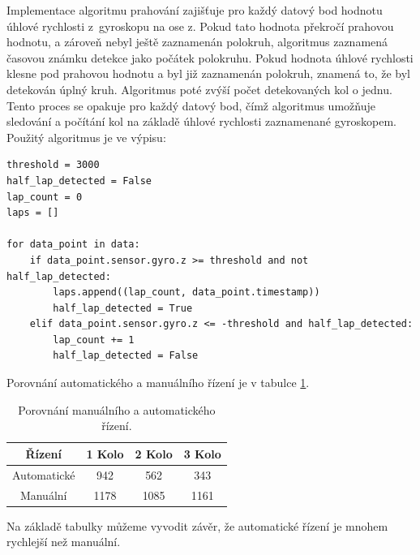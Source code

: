 Implementace algoritmu prahování zajišťuje pro každý datový bod hodnotu úhlové
rychlosti z~gyroskopu na ose z. Pokud tato hodnota překročí prahovou hodnotu, a
zároveň nebyl ještě zaznamenán polokruh, algoritmus zaznamená časovou známku detekce
jako počátek polokruhu. Pokud hodnota úhlové rychlosti klesne pod prahovou hodnotu a
byl již zaznamenán polokruh, znamená to, že byl detekován úplný kruh. Algoritmus
poté zvýší počet detekovaných kol o jednu. Tento proces se opakuje pro každý datový
bod, čímž algoritmus umožňuje sledování a počítání kol na základě úhlové rychlosti
zaznamenané gyroskopem. Použitý algoritmus je ve výpisu:
\begin{lstlisting}[caption = Počet kol, label = lst:countLap]
threshold = 3000
half_lap_detected = False
lap_count = 0
laps = []

for data_point in data:
    if data_point.sensor.gyro.z >= threshold and not half_lap_detected:
        laps.append((lap_count, data_point.timestamp))
        half_lap_detected = True
    elif data_point.sensor.gyro.z <= -threshold and half_lap_detected:
        lap_count += 1
        half_lap_detected = False
\end{lstlisting}

Porovnání automatického a manuálního řízení je v tabulce \ref{tab:Comparison}.
\begin{table}[!h]
    \centering
    \begin{tabular}{cccc}
        \hline
        \textbf{Řízení} & \textbf{1 Kolo} & \textbf{2 Kolo} & \textbf{3 Kolo} \\
        \hline
        Automatické           & 942       & 562 & 343          \\
        Manuální 			  & 1178       & 1085 & 1161           \\
        \hline
    \end{tabular}
    \caption{Porovnání manuálního a automatického řízení.}
    \label{tab:Comparison}
\end{table}

Na základě tabulky můžeme vyvodit závěr, že automatické řízení je mnohem rychlejší
než manuální.
\endinput
